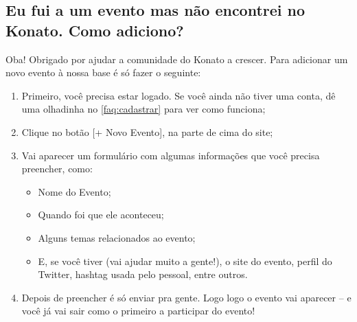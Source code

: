\documentclass[12pt,a4paper,twoside,hyphens,english,brazil]{abntex2}
\begin{document}
{\subsection[Como adiciono um novo evento?]{Eu fui a um evento mas não encontrei no Konato. Como adiciono?} \label{faq:submeter}
Oba! Obrigado por ajudar a comunidade do Konato a crescer. Para adicionar um novo evento à nossa base é só fazer o seguinte:
\begin{enumerate}[itemsep=-1ex]
	\item Primeiro, você precisa estar logado. Se você ainda não tiver uma conta, dê uma olhadinha no \autoref{faq:cadastrar} para ver como funciona;
	\item Clique no botão [+ Novo Evento], na parte de cima do site;
	\item Vai aparecer um formulário com algumas informações que você precisa preencher, como:
		\begin{itemize}[itemsep=-1ex]
			\item Nome do Evento;
			\item Quando foi que ele aconteceu;
			\item Alguns temas relacionados ao evento;
			\item E, se você tiver (vai ajudar muito a gente!), o site do evento, perfil do Twitter, hashtag usada pelo pessoal, entre outros.
		\end{itemize}
	\item Depois de preencher é só enviar pra gente. Logo logo o evento vai aparecer -- e você já vai sair como o primeiro a participar do evento!
\end{enumerate}

}
\end{document}
